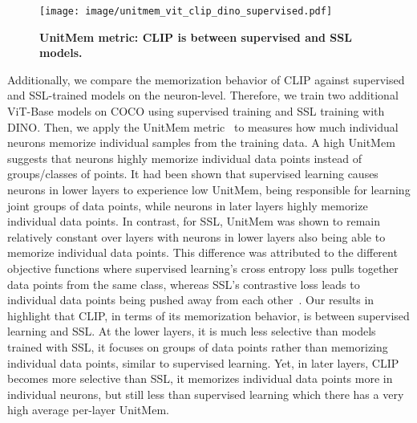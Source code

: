\begin{wrapfigure}{r}{0.4\textwidth}
\vspace{-0.5cm}
\begin{center}
\centerline{\texttt{[image: image/unitmem\_vit\_clip\_dino\_supervised.pdf]}}
\vspace{-0.2cm}
\caption{
\label{fig:unitmem}
\textbf{UnitMem metric: CLIP is between supervised and SSL models.
}
}
\end{center}
\vspace{-0.8cm}
\end{wrapfigure}
Additionally, we compare the memorization behavior of CLIP against supervised and SSL-trained models on the neuron-level.
Therefore, we train two additional ViT-Base models on COCO using supervised training and SSL training with DINO. Then, we apply the UnitMem metric~\citep{wang2024localizing} to measures how much individual neurons memorize individual samples from the training data. A high UnitMem suggests that neurons highly memorize individual data points instead of groups/classes of points. 
It had been shown that supervised learning causes neurons in lower layers to experience low UnitMem, \ie being responsible for learning joint groups of data points, while neurons in later layers highly memorize individual data points.
In contrast, for SSL, UnitMem was shown to remain relatively constant over layers with neurons in lower layers also being able to memorize individual data points. This difference was attributed to the different objective functions where supervised learning's cross entropy loss pulls together data points from the same class, whereas SSL's contrastive loss leads to individual data points being pushed away from each other~\citep{wang2024localizing}.
Our results in  highlight that CLIP, in terms of its memorization behavior, is between supervised learning and SSL. At the lower layers, it is much less selective than models trained with SSL, \ie it focuses on groups of data points rather than memorizing individual data points, similar to supervised learning.
Yet, in later layers, CLIP becomes more selective than SSL, \ie it memorizes individual data points more in individual neurons, but still less than supervised learning which there has a very high average per-layer UnitMem.



